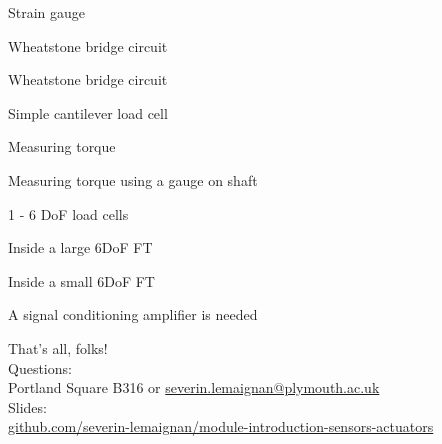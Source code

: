 \documentclass[compress]{beamer}
\begin{document}
{
    \begin{frame}{Strain gauge}
    \end{frame}
}

{
    \begin{frame}{Wheatstone bridge circuit}
    \end{frame}
}

{
    \begin{frame}{Wheatstone bridge circuit}
    \end{frame}
}

{
    \begin{frame}{Simple cantilever load cell}
    \end{frame}
}

{
    \begin{frame}{Measuring torque}
    \end{frame}
}

{
    \begin{frame}{Measuring torque using a gauge on shaft}
    \end{frame}
}

{
    \begin{frame}{1 - 6 DoF load cells}
    \end{frame}
}

{
    \begin{frame}{Inside a large 6DoF FT}
    \end{frame}
}

{
    \begin{frame}{Inside a small 6DoF FT}
    \end{frame}
}

{
    \begin{frame}{A signal conditioning amplifier is needed}
    \end{frame}
}


\begin{frame}{}
    \begin{center}
        \Large
        That's all, folks!\\[2em]
        \normalsize
        Questions:\\
        Portland Square B316 or \url{severin.lemaignan@plymouth.ac.uk} \\[1em]

        Slides:\\
        \href{https://github.com/severin-lemaignan/module-mobile-and-humanoid-robots}{\small
        github.com/severin-lemaignan/module-introduction-sensors-actuators}


    \end{center}
\end{frame}
\end{document}

